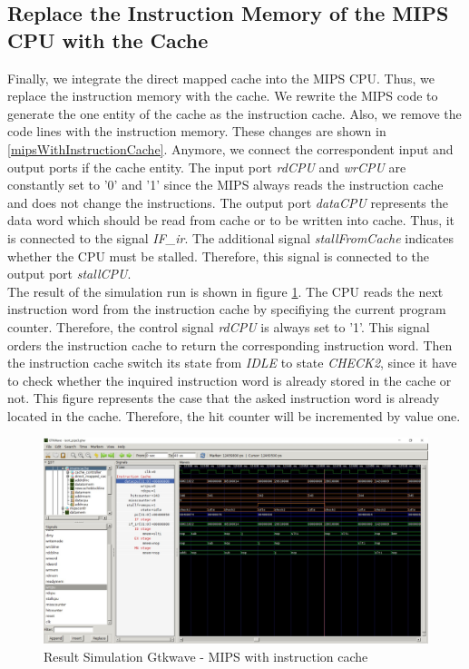 \subsection{Replace the Instruction Memory of the MIPS CPU with the Cache}
\label{sec:replaceInstructionMemory}
Finally, we integrate the direct mapped cache into the MIPS CPU. Thus, we replace the instruction memory with the cache. We rewrite the MIPS code to generate the one entity of the cache as the instruction cache. Also, we remove the code lines with the instruction memory. These changes are shown in \ref{mipsWithInstructionCache}. Anymore, we connect the correspondent input and output ports if the cache entity. The input port \textit{rdCPU} and \textit{wrCPU} are constantly set to '0' and '1' since the MIPS always reads the instruction cache and does not change the instructions. The output port \textit{dataCPU} represents the data word which should be read from cache or to be written into cache. Thus, it is connected to the signal \textit{IF\_ir}. The additional signal \textit{stallFromCache} indicates whether the CPU must be stalled. Therefore, this signal is connected to the output port \textit{stallCPU}.\\
The result of the simulation run is shown in figure \ref{fig:mipsWithInstrCache}. The CPU reads the next instruction word from the instruction cache by specifiying the current program counter. Therefore, the control signal \textit{rdCPU} is always set to '1'. This signal orders the instruction cache to return the corresponding instruction word. Then the instruction cache switch its state from \textit{IDLE} to state \textit{CHECK2}, since it have to check whether the inquired instruction word is already stored in the cache or not. This figure represents the case that the asked instruction word is already located in the cache. Therefore, the hit counter will be incremented by value one.


\begin{figure}
	\centering
	\includegraphics[scale=.4]{pictures/gtkwave_result_mipsWithInstructionCache}
	\caption{Result Simulation Gtkwave - MIPS with instruction cache}
	\label{fig:mipsWithInstrCache}
\end{figure}




